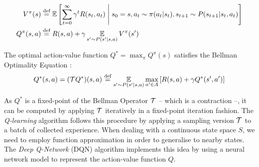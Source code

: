 \documentclass{article}
\begin{document}
\begin{align*}
V^\pi(s) &\eqdef \expectedvalue\left[\sum_{t=0}^\infty \gamma^t R(s_t, a_t)\condbar s_0=s, a_t\sim \pi(a_t|s_t), s_{t+1}\sim P(s_{t+1}|s_t, a_t)\right]\\
Q^\pi(s, a) &\eqdef R(s, a) + \gamma \expectedvalueover{s'\sim P(s'|s, a)} V^\pi(s')
\end{align*}

The optimal action-value function $Q^* =  \max_\pi Q^\pi(s)$ satisfies the Bellman Optimality Equation \citep{bellman}:
\begin{equation*}
Q^*(s, a) = (\cT Q^*) (s, a) \eqdef \expectedvalueover{s'\sim P(s'|s, a)} \max_{a'\in A} \left[R(s, a) + \gamma Q^*(s', a')\right]
\end{equation*}

As $Q^*$ is a fixed-point of the Bellman Operator $\mathcal{T}$ -- which is a contraction --, it can be computed by applying $\mathcal{T}$ iteratively in a fixed-point iteration fashion. The \emph{Q-learning} algorithm \citep{Watkins} follows this procedure by applying a sampling version $\mathcal{T}$ to a batch of collected experience. When dealing with a continuous state space $S$, we need to employ function approximation in order to generalise to nearby states. The \emph{Deep Q-Network} (DQN) algorithm \citep{Mnih} implements this idea by using a neural network model to represent the action-value function $Q$.
\end{document}

